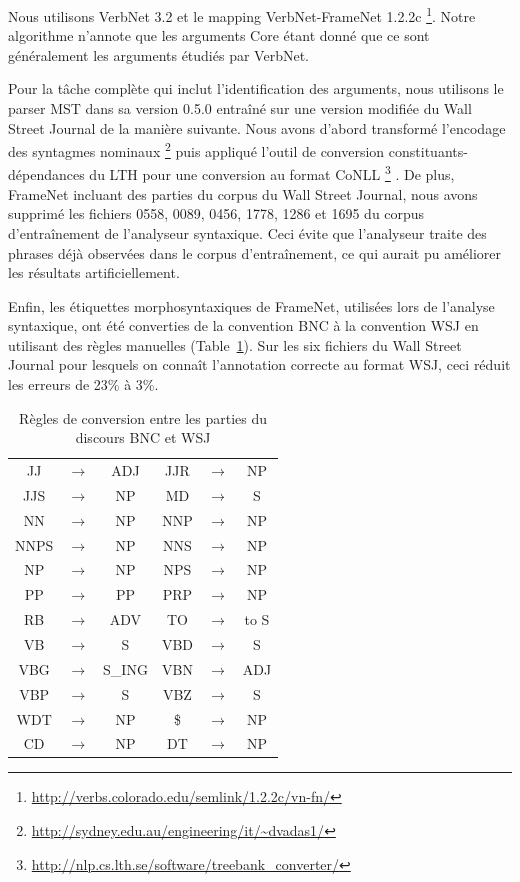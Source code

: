 Nous utilisons VerbNet 3.2 et le mapping VerbNet-FrameNet 1.2.2c
\footnote{\url{http://verbs.colorado.edu/semlink/1.2.2c/vn-fn/}}. Notre
algorithme n'annote que les arguments Core étant donné que ce sont généralement
les arguments étudiés par VerbNet.

Pour la tâche complète qui inclut l'identification des arguments, nous
utilisons le parser MST dans sa version 0.5.0 \citep{mcdonald2006multilingual}
entraîné sur une version modifiée du Wall Street Journal de la manière
suivante. Nous avons d'abord transformé l'encodage des syntagmes nominaux
\footnote{\url{http://sydney.edu.au/engineering/it/~dvadas1/}}
\citep{vadas2007adding} puis appliqué l'outil de conversion
constituants-dépendances du LTH pour une conversion au format CoNLL
\footnote{\url{http://nlp.cs.lth.se/software/treebank_converter/}}
\citep{johansson2007extended}. De plus, FrameNet incluant des parties du corpus
du Wall Street Journal, nous avons supprimé les fichiers 0558, 0089, 0456,
1778, 1286 et 1695 du corpus d'entraînement de l'analyseur syntaxique. Ceci
évite que l'analyseur traite des phrases déjà observées dans le corpus
d'entraînement, ce qui aurait pu améliorer les résultats artificiellement.

Enfin, les étiquettes morphosyntaxiques de FrameNet, utilisées lors de
l'analyse syntaxique, ont été converties de la convention BNC à la convention
WSJ en utilisant des règles manuelles (Table~\ref{table:tagset_rules}). Sur les
six fichiers du Wall Street Journal pour lesquels on connaît l'annotation
correcte au format WSJ, ceci réduit les erreurs de 23\% à 3\%.

\begin{table}[ht]
    \centering
    \begin{tabular}{ccc|ccc}
        \toprule
        JJ   &$\to$& ADJ    & JJR  &$\to$& NP     \\
        JJS  &$\to$& NP     & MD   &$\to$& S      \\
        NN   &$\to$& NP     & NNP  &$\to$& NP     \\
        NNPS &$\to$& NP     & NNS  &$\to$& NP     \\
        NP   &$\to$& NP     & NPS  &$\to$& NP     \\
        PP   &$\to$& PP     & PRP  &$\to$& NP     \\  
        RB   &$\to$& ADV    & TO   &$\to$& to S   \\
        VB   &$\to$& S      & VBD  &$\to$& S      \\
        VBG  &$\to$& S\_ING & VBN  &$\to$& ADJ    \\
        VBP  &$\to$& S      & VBZ  &$\to$& S      \\
        WDT  &$\to$& NP     & \$   &$\to$& NP     \\  
        CD   &$\to$& NP     & DT   &$\to$& NP     \\
        \bottomrule
    \end{tabular}
    \caption{\protect\centering\label{table:tagset_rules}Règles de conversion entre les parties du discours BNC et WSJ}
\end{table}

